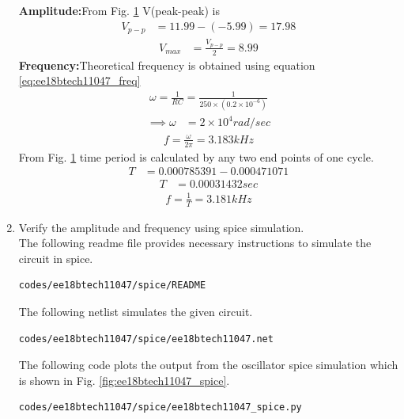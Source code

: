 \begin{enumerate}[label=\arabic*.,ref=\theenumi]
\begin{figure}[!ht]
\caption{}
\label{fig:ee18btech11047_fig8}
\end{figure}
\textbf{Amplitude:}From Fig. \ref{fig:ee18btech11047_fig8} V(peak-peak) is 
\begin{align}
V_{p-p} &= 11.99-(-5.99)= 17.98
\end{align}
\begin{align}
V_{max} &= \frac{V_{p-p}}{2} = 8.99
\end{align}
\textbf{Frequency:}Theoretical frequency is obtained using equation \eqref{eq:ee18btech11047_freq}
\begin{align}
\omega = \frac{1}{RC} = \frac{1}{250\times(0.2\times10^{-6})}
\end{align}
\begin{align}
\implies \omega&=2\times10^{4}rad/sec
\end{align}
\begin{align}
f = \frac{\omega }{2\pi} = 3.183 kHz \label{eq:ee18btech11047_f}
\end{align}
From Fig. \ref{fig:ee18btech11047_fig8} time period is calculated by any two end points of one cycle.
\begin{align}
T&=0.000785391-0.000471071
\end{align}
\begin{align}
T&= 0.00031432 sec
\end{align}
\begin{align}
f = \frac{1}{T} = 3.181 kHz
\end{align}
\item Verify the amplitude and frequency using spice simulation.\\
\solution The following readme file provides necessary instructions to simulate the circuit in spice.
\begin{lstlisting}
codes/ee18btech11047/spice/README
\end{lstlisting}
The following netlist simulates the given circuit.
\begin{lstlisting}
codes/ee18btech11047/spice/ee18btech11047.net
\end{lstlisting}
The following code plots the output from the oscillator spice simulation which is shown in Fig. \ref{fig:ee18btech11047_spice}.
\begin{lstlisting}
codes/ee18btech11047/spice/ee18btech11047_spice.py
\end{lstlisting}
\renewcommand{\thefigure}{\theenumi.\arabic{figure}}
%
\begin{figure}[!ht]
\centering

\end{figure}
\end{enumerate}
